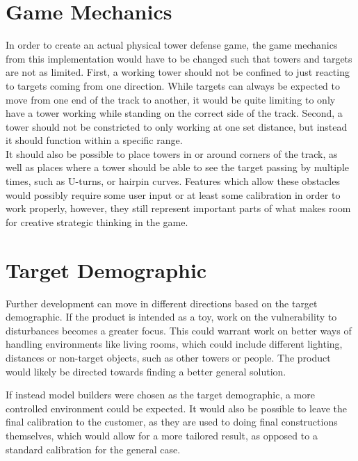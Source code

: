 \section{Game Mechanics}
In order to create an actual physical tower defense game, the game mechanics from this implementation would have to be changed such that towers and targets are not as limited. First, a working tower should not be confined to just reacting to targets coming from one direction. While targets can always be expected to move from one end of the track to another, it would be quite limiting to only have a tower working while standing on the correct side of the track. Second, a tower should not be constricted to only working at one set distance, but instead it should function within a specific range. \\

It should also be possible to place towers in or around corners of the track, as well as places where a tower should be able to see the target passing by multiple times, such as U-turns, or hairpin curves. Features which allow these obstacles would possibly require some user input or at least some calibration in order to work properly, however, they still represent important parts of what makes room for creative strategic thinking in the game.

\section{Target Demographic}
Further development can move in different directions based on the target demographic. If the product is intended as a toy, work on the vulnerability to disturbances becomes a greater focus. This could warrant work on better ways of handling environments like living rooms, which could include different lighting, distances or non-target objects, such as other towers or people. The product would likely be directed towards finding a better general solution.

If instead model builders were chosen as the target demographic, a more controlled environment could be expected. It would also be possible to leave the final calibration to the customer, as they are used to doing final constructions themselves, which would allow for a more tailored result, as opposed to a standard calibration for the general case.

